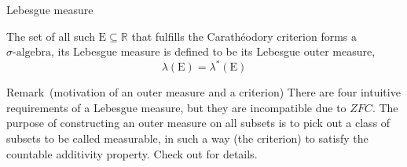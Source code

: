 \documentclass[utf-8, 10pt, aspectratio=1610]{beamer}
\begin{document}
\begin{frame}[allowframebreaks]{Lebesgue measure}
	\framebreak
	\vspace*{\fill}
	\begin{definition}
		The set of all such \(\mathrm{E}\subseteq \mathbb{R}\) that fulfills the Carathéodory criterion forms a \(\sigma \text{-algebra} \), its Lebesgue measure is defined to be its Lebesgue outer measure,
		\begin{equation}
			\lambda \left(\mathrm{E}\right) = \lambda^\ast \left(\mathrm{E}\right)
		\end{equation}
	\end{definition}
	\vspace*{\fill}
	\begin{block}{Remark\ (motivation of an outer measure and a criterion)}
		There are four intuitive requirements of a Lebesgue measure, but they are incompatible due to \(ZFC\). The purpose of constructing an outer measure on all subsets is to pick out a class of subsets to be called measurable, in such a way (the criterion) to satisfy the countable additivity property. Check out \cite{enwiki:1171717640} for details.
	\end{block}
	\vspace*{\fill}
\end{frame}
\end{document}
